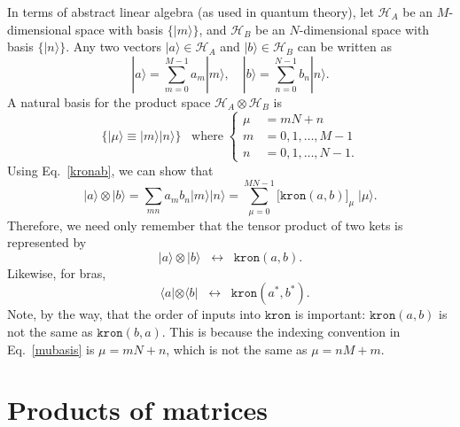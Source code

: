 \documentclass[pra,12pt]{revtex4}
\begin{document}
In terms of abstract linear algebra (as used in quantum theory), let
$\mathscr{H}_A$ be an $M$-dimensional space with basis
$\{|m\rangle\}$, and $\mathscr{H}_B$ be an $N$-dimensional space with
basis $\{|n\rangle\}$.  Any two vectors $|a\rangle \in \mathscr{H}_A$
and $|b\rangle \in \mathscr{H}_B$ can be written as
\begin{equation}
  |a\rangle = \sum_{m=0}^{M-1} a_m |m\rangle, \quad |b\rangle = \sum_{n=0}^{N-1} b_n |n\rangle.
\end{equation}
A natural basis for the product space $\mathscr{H}_A\otimes
\mathscr{H}_B$ is
\begin{equation}
  \Big\{|\mu\rangle \equiv |m\rangle |n\rangle\Big\}
  \;\;\;\mathrm{where} \;
  \begin{cases}
    \mu\!\!\!\! &= mN+n \\
    m \!\!\!\!&= 0,1,\dots,M-1 \\
    n \!\!\!\!&= 0,1, \dots, N-1.
  \end{cases}
  \label{mubasis}
\end{equation}
Using Eq.~\eqref{kronab}, we can show that
\begin{equation}
  |a\rangle\otimes|b\rangle
  = \sum_{mn} a_m b_n |m\rangle |n\rangle
  = \sum_{\mu=0}^{MN-1} \big[\texttt{kron}(a,b)\big]_\mu \; |\mu\rangle.
\end{equation}
Therefore, we need only remember that the tensor product of two
kets is represented by
\begin{equation}
  |a\rangle\otimes|b\rangle \;\;\leftrightarrow\;\;
  \texttt{kron}(a,b).
  \label{result1}
\end{equation}
Likewise, for bras,
\begin{equation}
  \;\;\,\langle a| \otimes \langle b| \;\;\leftrightarrow\;\;
  \texttt{kron}(a^*,b^*).
  \label{result1a}
\end{equation}
Note, by the way, that the order of inputs into $\texttt{kron}$ is
important: $\texttt{kron}(a,b)$ is not the same as
$\texttt{kron}(b,a)$.  This is because the indexing convention in
Eq.~\eqref{mubasis} is $\mu = mN+n$, which is not the same as $\mu =
nM+m$.

\section{Products of matrices}
\end{document}
